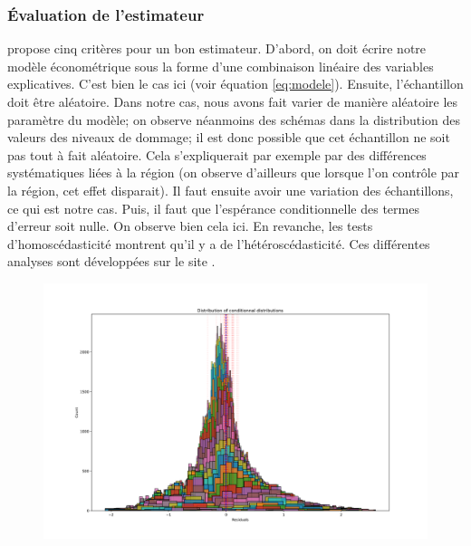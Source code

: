 \subsubsection{Évaluation de l'estimateur} \textcite{wooldridge_introductory_2016} propose cinq critères pour un bon estimateur. D'abord, on doit écrire notre modèle économétrique sous la forme d'une combinaison linéaire des variables explicatives. C'est bien le cas ici (voir équation \ref{eq:modele}). Ensuite, l'échantillon doit être aléatoire. Dans notre cas, nous avons fait varier de manière aléatoire les paramètre du modèle; on observe néanmoins des schémas dans la distribution des valeurs des niveaux de dommage; il est donc possible que cet échantillon ne soit pas tout à fait aléatoire. Cela s'expliquerait par exemple par des différences systématiques liées à la région (on observe d'ailleurs que lorsque l'on contrôle par la région, cet effet disparait).  Il faut ensuite avoir une variation des échantillons, ce qui est notre cas. Puis, il faut que l'espérance conditionnelle des termes d'erreur soit nulle. On observe bien cela ici. En revanche, les tests d'homoscédasticité montrent qu'il y a de l'hétéroscédasticité.  Ces différentes analyses sont développées sur le site .

\begin{figure}
    \centering
    \includegraphics[width=\linewidth]{results/slr_4_2.png}
    \label{fig:slr_4}
\end{figure}

